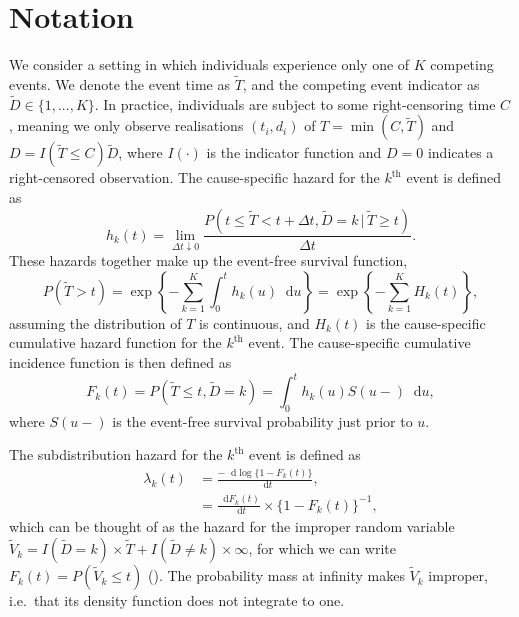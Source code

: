 \documentclass[
  letterpaper,
  paper=240mm:170mm,
  twoside=true,
  open=right,
  fontsize=10pt,
  pagesize=false,
  BCOR=15mm,
  DIV=14,
  headinclude=true,
  footinclude=false,
  headsepline=on]{scrbook}
\newcommand{\given}{\,|\,}
\newcommand\diff{\mathop{}\!\mathrm{d}}
\begin{document}
\section{Notation}\label{sec-notation}

We consider a setting in which individuals experience only one of \(K\)
competing events. We denote the event time as \(\tilde{T}\), and the
competing event indicator as \(\tilde{D} \in \{1,...,K\}\). In practice,
individuals are subject to some right-censoring time \(C\), meaning we
only observe realisations \((t_i, d_i)\) of \(T = \min(C,\tilde{T})\)
and \(D = I(\tilde{T} \leq C)\tilde{D}\), where \(I(\cdot)\) is the
indicator function and \(D = 0\) indicates a right-censored observation.
The cause-specific hazard for the \(k^{\text{th}}\) event is defined
as\\
\begin{equation*} 
    h_k(t) = \lim_{\Delta t \downarrow 0} \frac{P(t \leq \tilde{T} < t + \Delta t, \tilde{D} = k \given \tilde{T} \geq t)}{\Delta t}.
\end{equation*} These hazards together make up the event-free survival
function, \begin{equation*}
    P(\tilde{T} > t) = \exp \left\{ - \sum_{k = 1}^{K} \int_{0}^{t} h_k(u)\diff u \right\} = \exp \left\{ - \sum_{k = 1}^{K} H_k(t) \right\},
\end{equation*} assuming the distribution of \(T\) is continuous, and
\(H_k(t)\) is the cause-specific cumulative hazard function for the
\(k^{\text{th}}\) event. The cause-specific cumulative incidence
function is then defined as \begin{equation*}
    F_k(t) = P(\tilde{T} \leq t, \tilde{D} = k) = \int_{0}^{t}h_k(u)S(u-)\diff u,
\end{equation*} where \(S(u-)\) is the event-free survival probability
just prior to \(u\).

The subdistribution hazard for the \(k^{\text{th}}\) event is defined as
\begin{align*}
    \lambda_k(t) &= \frac{-\diff \log \{1 - F_k(t)\}}{\diff t}, \\
    &= \frac{\diff F_k(t)}{\diff t} \times \{1 - F_k(t)\}^{-1}, 
\end{align*} which can be thought of as the hazard for the improper
random variable
\(\tilde{V}_k = I(\tilde{D} = k) \times \tilde{T} + I(\tilde{D} \neq k) \times \infty\),
for which we can write \(F_k(t) = P(\tilde{V}_k \leq t)\)
(). The probability mass at infinity makes
\(\tilde{V}_k\) improper, i.e.~that its density function does not
integrate to one.
\end{document}
